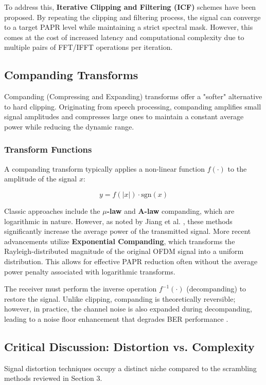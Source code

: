 \documentclass[conference]{IEEEtran}
\begin{document}
To address this, \textbf{Iterative Clipping and Filtering (ICF)} schemes have been proposed. By repeating the clipping and filtering process, the signal can converge to a target PAPR level while maintaining a strict spectral mask. However, this comes at the cost of increased latency and computational complexity due to multiple pairs of FFT/IFFT operations per iteration.

\subsection{Companding Transforms}
Companding (Compressing and Expanding) transforms offer a "softer" alternative to hard clipping. Originating from speech processing, companding amplifies small signal amplitudes and compresses large ones to maintain a constant average power while reducing the dynamic range.

\subsubsection{Transform Functions}
A companding transform typically applies a non-linear function $f(\cdot)$ to the amplitude of the signal $x$:

\begin{equation}
    y = f(|x|) \cdot \text{sgn}(x)
\end{equation}

Classic approaches include the \textbf{$\mu$-law} and \textbf{A-law} companding, which are logarithmic in nature. However, as noted by Jiang et al. \cite{ref10}, these methods significantly increase the average power of the transmitted signal. More recent advancements utilize \textbf{Exponential Companding}, which transforms the Rayleigh-distributed magnitude of the original OFDM signal into a uniform distribution. This allows for effective PAPR reduction often without the average power penalty associated with logarithmic transforms.

The receiver must perform the inverse operation $f^{-1}(\cdot)$ (decompanding) to restore the signal. Unlike clipping, companding is theoretically reversible; however, in practice, the channel noise is also expanded during decompanding, leading to a noise floor enhancement that degrades BER performance \cite{ref11}.

\subsection{Critical Discussion: Distortion vs. Complexity}
Signal distortion techniques occupy a distinct niche compared to the scrambling methods reviewed in Section 3.
\end{document}
